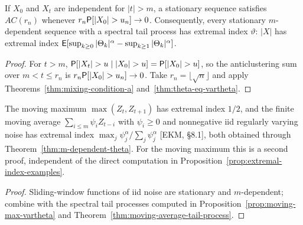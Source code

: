 \begin{theorem}
  \label{thm:m-dependent-theta}
  \leanok
  If $X_0$ and $X_t$ are independent for $|t| > m$, a stationary sequence satisfies $AC(r_n)$ whenever
  $r_n \mathsf{P}[|X_0| > u_n] \to 0$. Consequently, every stationary $m$-dependent sequence with a spectral
  tail process has extremal index $\vartheta$: $|X|$ has extremal index
  $\mathsf{E}[\sup_{k\ge0}|\Theta_k|^\alpha - \sup_{k\ge1}|\Theta_k|^\alpha]$.
\end{theorem}
\begin{proof}
  \leanok
  For $t > m$, $\mathsf{P}[|X_t| > u \mid |X_0| > u] = \mathsf{P}[|X_0| > u]$, so the anticlustering sum over
  $m < t \le r_n$ is $r_n \mathsf{P}[|X_0| > u_n] \to 0$. Take $r_n = \lfloor \sqrt n \rfloor$ and apply
  Theorems~\ref{thm:mixing-condition-a} and~\ref{thm:theta-eq-vartheta}.
\end{proof}

\begin{corollary}
  \label{cor:moving-average-theta}
  \leanok
  The moving maximum $\max(Z_t, Z_{t+1})$ has extremal index $1/2$, and the finite moving average
  $\sum_{i \le m} \psi_i Z_{t-i}$ with $\psi_i \ge 0$ and nonnegative iid regularly varying noise has
  extremal index $\max_j \psi_j^\alpha / \sum_j \psi_j^\alpha$ [EKM, \S8.1], both obtained through
  Theorem~\ref{thm:m-dependent-theta}. For the moving maximum this is a second proof, independent of
  the direct computation in Proposition~\ref{prop:extremal-index-examples}.
\end{corollary}
\begin{proof}
  \leanok
  Sliding-window functions of iid noise are stationary and $m$-dependent; combine with the spectral tail
  processes computed in Proposition~\ref{prop:moving-max-vartheta} and
  Theorem~\ref{thm:moving-average-tail-process}.
\end{proof}

